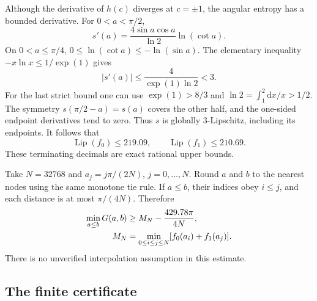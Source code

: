 \documentclass[aps,pra,reprint,amsmath,amssymb,longbibliography,nofootinbib]{revtex4-2}
\newcommand{\dd}{\mathrm{d}}
\begin{document}
Although the derivative of $h(c)$ diverges at $c=\pm1$, the angular entropy
has a bounded derivative. For $0<a<\pi/2$,
\begin{equation}
 s'(a)=\frac{4\sin a\cos a}{\ln2}\ln(\cot a).
\end{equation}
On $0<a\leq\pi/4$, $0\leq\ln(\cot a)\leq-\ln(\sin a)$.
The elementary inequality $-x\ln x\leq1/\exp(1)$ gives
\begin{equation}
 |s'(a)|\leq\frac{4}{\exp(1)\ln2}<3.
\end{equation}
For the last strict bound one can use $\exp(1)>8/3$ and
$\ln2=\int_1^2\dd x/x>1/2$. The symmetry $s(\pi/2-a)=s(a)$
covers the other half, and the one-sided endpoint derivatives tend to zero.
Thus $s$ is globally $3$-Lipschitz, including its endpoints. It follows that
\begin{equation}
 \operatorname{Lip}(f_0)\leq219.09,\qquad
 \operatorname{Lip}(f_1)\leq210.69.
 \label{eq:lipschitz}
\end{equation}
These terminating decimals are exact rational upper bounds.

Take $N=32768$ and $a_j=j\pi/(2N)$, $j=0,\ldots,N$.
Round $a$ and $b$ to the nearest nodes using the same monotone tie rule.
If $a\leq b$, their indices obey $i\leq j$, and each distance is at most
$\pi/(4N)$. Therefore
\begin{align}
 \min_{a\leq b}G(a,b)&\geq M_N-\frac{429.78\pi}{4N},\label{eq:cover}\\
 M_N&=\min_{0\leq i\leq j\leq N}[f_0(a_i)+f_1(a_j)].\notag
\end{align}
There is no unverified interpolation assumption in this estimate.

\subsection{The finite certificate}
\end{document}
